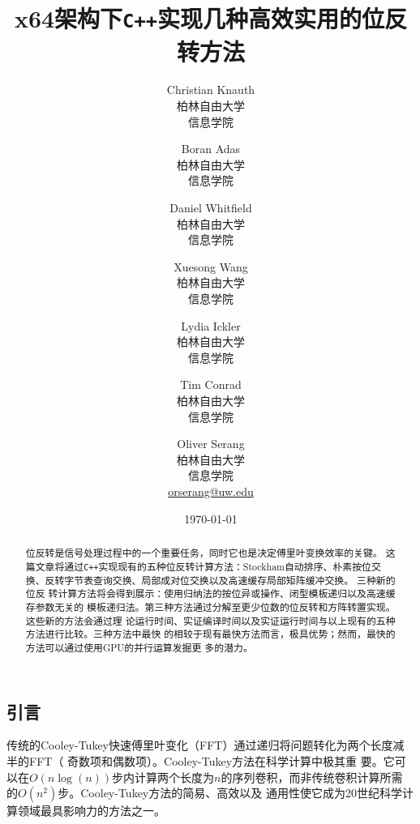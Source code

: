\documentclass[10pt]{article}
\begin{document}
\begin{CJK*}{UTF8}{gbsn}

\title{x64架构下{\tt C++}实现几种高效实用的位反转方法}

\author{Christian Knauth\\
柏林自由大学\\
信息学院
\and
Boran Adas\\
柏林自由大学\\
信息学院
\and
Daniel Whitfield\\
柏林自由大学\\
信息学院
\and
Xuesong Wang\\
柏林自由大学\\
信息学院
\and
Lydia Ickler\\
柏林自由大学\\
信息学院
\and
Tim Conrad\\
柏林自由大学\\
信息学院
\and
Oliver Serang\\
柏林自由大学\\
信息学院\\
\url{orserang@uw.edu}
}

\date{{\small \today}}

\maketitle

\begin{abstract}
\noindent 位反转是信号处理过程中的一个重要任务，同时它也是决定傅里叶变换效率的关键。
这篇文章将通过{\tt C++}实现现有的五种位反转计算方法：Stockham自动排序、朴素按位交
换、反转字节表查询交换、局部成对位交换以及高速缓存局部矩阵缓冲交换。 三种新的位反
转计算方法将会得到展示：使用归纳法的按位异或操作、闭型模板递归以及高速缓存参数无关的
模板递归法。第三种方法通过分解至更少位数的位反转和方阵转置实现。这些新的方法会通过理
论运行时间、实证编译时间以及实证运行时间与以上现有的五种方法进行比较。三种方法中最快
的相较于现有最快方法而言，极具优势；然而，最快的方法可以通过使用GPU的并行运算发掘更
多的潜力。
\end{abstract}

\section*{引言}
传统的Cooley-Tukey快速傅里叶变化（FFT）通过递归将问题转化为两个长度减半的FFT（
奇数项和偶数项）\cite{cooley:algorithm}。Cooley-Tukey方法在科学计算中极其重
要。它可以在$O(n \log(n))$步内计算两个长度为$n$的序列卷积，而非传统卷积计算所需
的$O(n^2)$步\cite{proakis:introduction}。Cooley-Tukey方法的简易、高效以及
通用性使它成为20世纪科学计算领域最具影响力的方法之一\cite{cipra:best}。


\end{CJK*}
\end{document}
